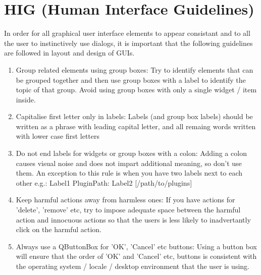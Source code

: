 \hypertarget{toc54}{}
\section{HIG (Human Interface Guidelines)}
In order for all graphical user interface elements to appear consistant and to
all the user to instinctively use dialogs, it is important that the following
guidelines are followed in layout and design of GUIs.

 \begin{enumerate}
 \item Group related elements using group boxes:
   Try to identify elements that can be grouped together and then use group
   boxes with a label to identify the topic of that group.  Avoid using group
   boxes with only a single widget / item inside.
 \item Capitalise first letter only in labels:
   Labels (and group box labels) should be written as a phrase with leading
   capital letter, and all remaing words written with lower case first letters 
 \item Do not end labels for widgets or group boxes with a colon:
   Adding a colon causes visual noise and does not impart additional meaning,
   so don't use them. An exception to this rule is when you have two labels next
   to each other e.g.: Label1 {Plugin}{Path:} Label2 [/path/to/plugins]
 \item Keep harmful actions away from harmless ones:
   If you have actions for 'delete', 'remove' etc, try to impose adequate space
   between the harmful action and innocuous actions so that the users is less
   likely to inadvertantly click on the harmful action.
 \item Always use a QButtonBox for 'OK', 'Cancel' etc buttons:
   Using a button box will ensure that the order of 'OK' and 'Cancel' etc,
   buttons is consistent with the operating system / locale / desktop
   environment that the user is using.
 \end{enumerate}


